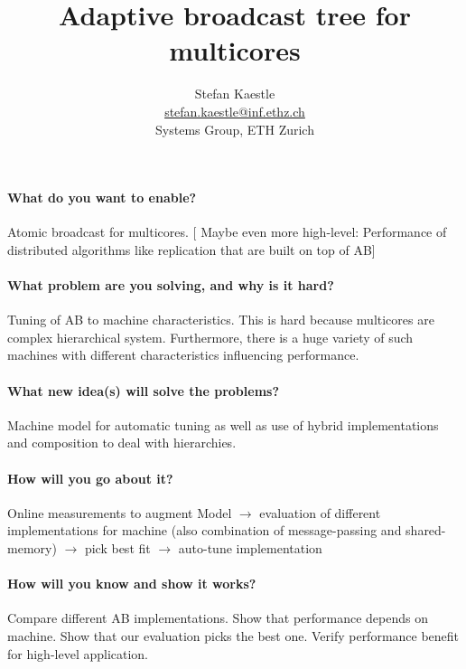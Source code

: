 \documentclass{article}
\newcommand{\stefan}[1]{
  {\color{skRed}[{\color{red}{SK}} #1]}}
\begin{document}
\title{Adaptive broadcast tree for multicores}

\newcommand{\eaddr}{stefan.kaestle@inf.ethz.ch}
\newcommand{\email}{\href{mailto:\eaddr}{\eaddr}}

\author{Stefan Kaestle\\
  \email \\
  Systems Group, ETH Zurich}

\maketitle

\newcommand{\ska}{$\rightarrow$\xspace}

\paragraph{What do you want to enable?} 
Atomic broadcast for multicores. \stefan{Maybe even more high-level:
  Performance of distributed algorithms like replication that are
  built on top of AB}

\paragraph{What problem are you solving, and why is it hard?} 
Tuning of AB to machine characteristics. This is hard because
multicores are complex hierarchical system. Furthermore, there is a
huge variety of such machines with different characteristics
influencing performance.

\paragraph{What new idea(s) will solve the problems?}
Machine model for automatic tuning as well as use of hybrid
implementations and composition to deal with hierarchies.

\paragraph{How will you go about it?}
Online measurements to augment Model \ska evaluation of different
implementations for machine (also combination of message-passing and
shared-memory) \ska pick best fit \ska auto-tune implementation

\paragraph{How will you know and show it works?}
Compare different AB implementations. Show that performance depends on
machine. Show that our evaluation picks the best one. Verify
performance benefit for high-level application.
\end{document}
